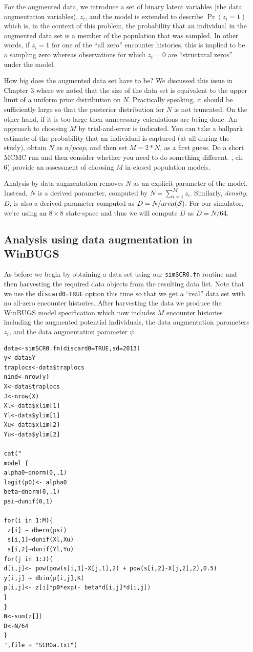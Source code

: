 For the augmented data, we introduce a set of binary latent variables
(the data augmentation variables), $z_{i}$, and the model is extended
to describe $\Pr(z_{i} = 1)$ which is, in the context of this problem,
the probability that an individual in the augmented data set is a
member of the population that was sampled. In other words, if $z_{i}=1$
for one of the ``all zero'' encounter histories, this is implied to be
a sampling zero whereas observations for which $z_{i}=0$ are
``structural zeros'' under the model.

How big does the augmented data set have to be? We discussed this
issue in Chapter 3 where we noted that the size of the data set is
equivalent to the upper limit of a uniform prior distribution on $N$.
Practically speaking, it should be sufficiently large so that the
posterior distribution for $N$ is not truncated. On the other hand, if
it is too large then unnecessary calculations are being done. An
approach to choosing $M$ by trial-and-error is indicated. You can take
a ballpark estimate of the probability that an individual is captured
(at all during the study), obtain $N$ as $n/pcap$, and then set $M =
2*N$, as a first guess. Do a short MCMC run and then consider whether
you need to do something different. \citet{kery_schaub:2011}, ch. 6) provide an assessment of choosing $M$ in closed population models. 

Analysis by data augmentation removes $N$ as an explicit parameter of the model. Instead, $N$ is a derived parameter, computed by $N= \sum_{i=1}^{M} z_{i}$. Similarly, {\it density}, $D$, is also a derived parameter computed as $D=N/area({\cal S})$. For our simulator, we're using an $8 \times 8$ state-space and thus we will compute $D$ as $D=N/64$.

\subsection{Analysis using data augmentation in WinBUGS}
As before we begin by obtaining a data set using our \mbox{\tt simSCR0.fn} routine and then harvesting the required data objects from the resulting data list.  Note that we use the \mbox{\tt discard0=TRUE} option this time so that we get a ``real'' data set with no all-zero encounter histories. After harvesting the data we produce the WinBUGS model specification which now includes $M$ encounter histories including the augmented potential individuals, the data augmentation parameters $z_{i}$, and the data augmentation parameter $\psi$.
\begin{verbatim}
data<-simSCR0.fn(discard0=TRUE,sd=2013)
y<-data$Y
traplocs<-data$traplocs
nind<-nrow(y)
X<-data$traplocs
J<-nrow(X)
Xl<-data$xlim[1]
Yl<-data$ylim[1]
Xu<-data$xlim[2]
Yu<-data$ylim[2]

cat("
model {
alpha0~dnorm(0,.1)
logit(p0)<- alpha0
beta~dnorm(0,.1)
psi~dunif(0,1)

for(i in 1:M){
 z[i] ~ dbern(psi)
 s[i,1]~dunif(Xl,Xu)
 s[i,2]~dunif(Yl,Yu) 
for(j in 1:J){
d[i,j]<- pow(pow(s[i,1]-X[j,1],2) + pow(s[i,2]-X[j,2],2),0.5)
y[i,j] ~ dbin(p[i,j],K)
p[i,j]<- z[i]*p0*exp(- beta*d[i,j]*d[i,j])
}
}
N<-sum(z[])
D<-N/64
}
",file = "SCR0a.txt")
\end{verbatim}

